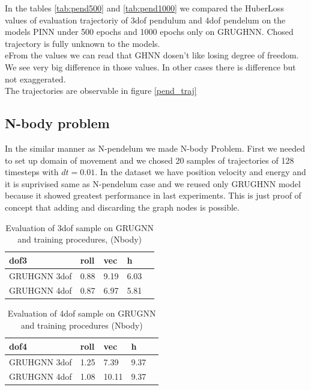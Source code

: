 In the tables \ref{tab:pend500} and  \ref{tab:pend1000} we compared the HuberLoss values of evaluation trajectoriy of 3dof pendulum and 4dof pendelum on the models PINN under 500 epochs  and 1000 epochs only on GRUGHNN. Chosed trajectory is fully unknown to the models.\\ 
eFrom the values we can read that GHNN dosen't like losing degree of freedom. We see very big difference in those values. In other cases there is difference but not exaggerated.\\
The trajectories are observable in figure \ref{pend_traj}

\subsection{N-body problem}
In the similar manner as N-pendelum we made N-body Problem.
First we needed to set up domain of movement and we chosed 20 samples of trajectories of 128 timesteps with $dt =0.01$. In the dataset we have position velocity and energy and it is suprivised same as N-pendelum case and we reused only GRUGHNN model because it showed greatest performance in last experiments. This is just proof of concept that adding and discarding the graph nodes is possible.
\begin{table}[h!]
	\centering
	\caption{Evaluation of 3dof sample on GRUGNN and training procedures, (Nbody)} %
	\label{tab:my_label}  
\begin{tabular}{|l|l|l|l|l|}
	\hline
	dof3 & roll & vec & h\\  
	\hline
	GRUHGNN 3dof & 0.88 & 9.19 & 6.03 \\  
	\hline
	GRUHGNN 4dof & 0.87 & 6.97 & 5.81 \\  
	\hline
\end{tabular}
\end{table}

\begin{table}[h!]
	\centering
	\caption{Evaluation of 4dof sample on GRUGNN and training procedures (Nbody)} %
	\label{tab:my_label}  
\begin{tabular}{|l|l|l|l|l|}
	\hline
	dof4 & roll & vec & h\\  
	\hline
	GRUHGNN 3dof & 1.25 & 7.39 & 9.37 \\  
	\hline
	GRUHGNN 4dof & 1.08 & 10.11 & 9.37 \\  
	\hline
\end{tabular}
\end{table}



